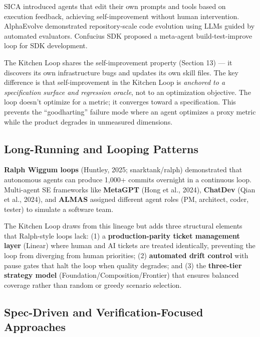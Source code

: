\documentclass[11pt,a4paper]{article}
\begin{document}
SICA \cite{sica2025} introduced agents that edit their own prompts and tools based on execution feedback, achieving self-improvement without human intervention. AlphaEvolve \cite{alphaevolve2025} demonstrated repository-scale code evolution using LLMs guided by automated evaluators. Confucius SDK \cite{confucius2025} proposed a meta-agent build-test-improve loop for SDK development.

The Kitchen Loop shares the self-improvement property (Section 13) --- it discovers its own infrastructure bugs and updates its own skill files. The key difference is that self-improvement in the Kitchen Loop is \emph{anchored to a specification surface and regression oracle}, not to an optimization objective. The loop doesn't optimize for a metric; it converges toward a specification. This prevents the ``goodharting'' failure mode where an agent optimizes a proxy metric while the product degrades in unmeasured dimensions.

\subsection{Long-Running and Looping Patterns}\label{sec:long-running-and-looping-patterns}

\textbf{Ralph Wiggum loops} (Huntley, 2025; snarktank/ralph) demonstrated that autonomous agents can produce 1,000+ commits overnight in a continuous loop. Multi-agent SE frameworks like \textbf{MetaGPT} (Hong et al., 2024), \textbf{ChatDev} (Qian et al., 2024), and \textbf{ALMAS} assigned different agent roles (PM, architect, coder, tester) to simulate a software team.

The Kitchen Loop draws from this lineage but adds three structural elements that Ralph-style loops lack: (1) a \textbf{production-parity ticket management layer} (Linear) where human and AI tickets are treated identically, preventing the loop from diverging from human priorities; (2) \textbf{automated drift control} with pause gates that halt the loop when quality degrades; and (3) the \textbf{three-tier strategy model} (Foundation/Composition/Frontier) that ensures balanced coverage rather than random or greedy scenario selection.

\subsection{Spec-Driven and Verification-Focused Approaches}\label{sec:spec-driven-and-verification-focused-approaches}
\end{document}
